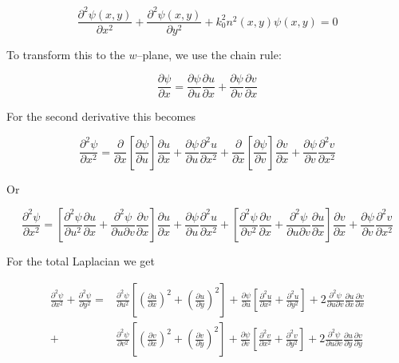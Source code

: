 \begin{equation}
\frac{\partial^2 \psi(x,y)}{\partial x^2} + \frac{\partial^2 \psi(x,y)}{\partial
y^2} + k_0^2 n^2(x,y) \psi(x,y) = 0
\end{equation} 

To transform this to the $w$--plane, we use the chain rule:

\begin{equation}
\frac{\partial \psi}{\partial x} = \frac{\partial \psi}{\partial u}
\frac{\partial u}{\partial x} + \frac{\partial \psi}{\partial v} \frac{\partial
v}{\partial x}
\end{equation} 

For the second derivative this becomes

\begin{equation}
\frac{\partial^2 \psi}{\partial x^2} = \frac{\partial}{\partial x} \left[
\frac{\partial \psi}{\partial u}\right]  \frac{\partial u}{\partial x} +
\frac{\partial \psi}{\partial u}\frac{\partial^2 u}{\partial x^2} +  
\frac{\partial}{\partial x} \left[ \frac{\partial \psi}{\partial v}\right] 
\frac{\partial v}{\partial x}  + \frac{\partial \psi}{\partial
v}\frac{\partial^2 v}{\partial x^2}
\end{equation} 

Or

\begin{equation}
\frac{\partial^2 \psi}{\partial x^2} = \left[ \frac{\partial^2 \psi}{\partial
u^2 } \frac{\partial u}{\partial x} +  \frac{\partial^2 \psi}{\partial u
\partial v} \frac{\partial v}{\partial x} \right] \frac{\partial u}{\partial x}
 + \frac{\partial \psi}{\partial u}\frac{\partial^2 u}{\partial x^2} 
+ \left[ \frac{\partial^2 \psi}{\partial v^2 } \frac{\partial v}{\partial x} + 
\frac{\partial^2 \psi}{\partial u \partial v} \frac{\partial u}{\partial x}
\right] \frac{\partial v}{\partial x}  
+ \frac{\partial \psi}{\partial v}\frac{\partial^2 v}{\partial x^2}
\end{equation} 

For the total Laplacian we get

\begin{align}
\frac{\partial^2 \psi}{\partial x^2} + \frac{\partial^2 \psi}{\partial y^2}=& 
\frac{\partial^2 \psi}{\partial u^2 }  \left [ \left(\frac{\partial u}{\partial
x}\right)^2 
+ \left(\frac{\partial u}{\partial y}\right)^2\right]+ \frac{\partial
\psi}{\partial u} \left[ \frac{\partial^2 u}{\partial x^2} 
+ \frac{\partial^2 u}{\partial y^2} \right] 
+ 2\frac{\partial^2 \psi}{\partial u \partial v} \frac{\partial u}{\partial x}
\frac{\partial v}{\partial x}    \nonumber \\  
+& \frac{\partial^2 \psi}{\partial v^2}  \left[ \left(\frac{\partial v}{\partial
x}\right)^2  
+ \left(\frac{\partial v}{\partial y}\right)^2\right] + \frac{\partial
\psi}{\partial v} \left[ \frac{\partial^2 v}{\partial x^2} 
+ \frac{\partial^2 v}{\partial y^2} \right]
+ 2\frac{\partial^2 \psi}{\partial u \partial v} \frac{\partial u}{\partial y}
\frac{\partial v}{\partial y}
\label{eq-conf-trans-1}
\end{align} 

